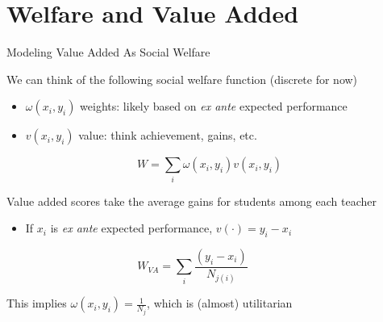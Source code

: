 \documentclass[t,aspectratio=169,11pt]{beamer}
\newenvironment{wideitemize}{\itemize\addtolength{\itemsep}{14pt}}{\enditemize}
\begin{document}
\section{Welfare and Value Added}
\begin{frame}{Modeling Value Added As Social Welfare}

\begin{wideitemize}
    \item We can think of the following social welfare function (discrete for now)
    \begin{itemize}
        \item $\omega(x_i,y_i)$ weights: likely based on \textit{ex ante} expected performance
        \item $v(x_i,y_i)$ value: think achievement, gains, etc.
    \end{itemize}
    \[
    W  = \sum_i \omega(x_i,y_i) v(x_i,y_i) 
    \] 
    
    \item Value added scores take the average gains for students among each teacher
    \begin{itemize}
        \item If $x_i$ is \textit{ex ante} expected performance, $v(\cdot) = y_i - x_i$
    \end{itemize}
    \[
    W_{VA}  = \sum_i \frac{(y_i-x_i)}{N_{j(i)}} \hspace{3em}
    \]
    
    \item This implies $\omega(x_i,y_i)=\frac{1}{N_j}$, which is (almost) utilitarian
    
    
\end{wideitemize}


\end{frame}
\end{document}

